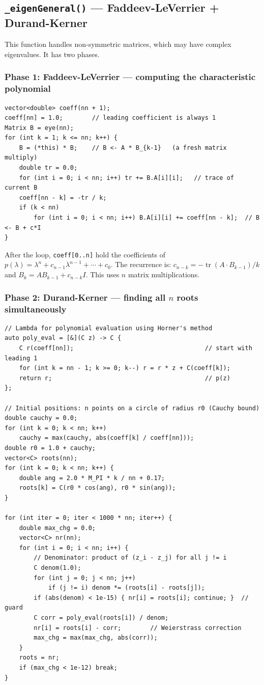 \documentclass[12pt, a4paper]{article}
\newcommand{\code}[1]{\texttt{\small#1}}
\newcommand{\fn}[1]{\texttt{\small\color{funcgreen}#1}}
\begin{document}
\subsection{\fn{\_eigenGeneral()} --- Faddeev-LeVerrier + Durand-Kerner}

This function handles non-symmetric matrices, which may have complex eigenvalues.
It has two phases.

\subsubsection{Phase 1: Faddeev-LeVerrier --- computing the characteristic polynomial}

\begin{lstlisting}
vector<double> coeff(nn + 1);
coeff[nn] = 1.0;        // leading coefficient is always 1
Matrix B = eye(nn);
for (int k = 1; k <= nn; k++) {
    B = (*this) * B;    // B <- A * B_{k-1}   (a fresh matrix multiply)
    double tr = 0.0;
    for (int i = 0; i < nn; i++) tr += B.A[i][i];   // trace of current B
    coeff[nn - k] = -tr / k;
    if (k < nn)
        for (int i = 0; i < nn; i++) B.A[i][i] += coeff[nn - k];  // B <- B + c*I
}
\end{lstlisting}

After the loop, \code{coeff[0..n]} hold the coefficients of
$p(\lambda) = \lambda^n + c_{n-1}\lambda^{n-1} + \cdots + c_0$.
The recurrence is: $c_{n-k} = -\operatorname{tr}(A \cdot B_{k-1}) / k$ and
$B_k = A B_{k-1} + c_{n-k} I$.  This uses $n$ matrix multiplications.

\subsubsection{Phase 2: Durand-Kerner --- finding all $n$ roots simultaneously}

\begin{lstlisting}
// Lambda for polynomial evaluation using Horner's method
auto poly_eval = [&](C z) -> C {
    C r(coeff[nn]);                                    // start with leading 1
    for (int k = nn - 1; k >= 0; k--) r = r * z + C(coeff[k]);
    return r;                                          // p(z)
};

// Initial positions: n points on a circle of radius r0 (Cauchy bound)
double cauchy = 0.0;
for (int k = 0; k < nn; k++)
    cauchy = max(cauchy, abs(coeff[k] / coeff[nn]));
double r0 = 1.0 + cauchy;
vector<C> roots(nn);
for (int k = 0; k < nn; k++) {
    double ang = 2.0 * M_PI * k / nn + 0.17;
    roots[k] = C(r0 * cos(ang), r0 * sin(ang));
}

for (int iter = 0; iter < 1000 * nn; iter++) {
    double max_chg = 0.0;
    vector<C> nr(nn);
    for (int i = 0; i < nn; i++) {
        // Denominator: product of (z_i - z_j) for all j != i
        C denom(1.0);
        for (int j = 0; j < nn; j++)
            if (j != i) denom *= (roots[i] - roots[j]);
        if (abs(denom) < 1e-15) { nr[i] = roots[i]; continue; }  // guard
        C corr = poly_eval(roots[i]) / denom;
        nr[i] = roots[i] - corr;        // Weierstrass correction
        max_chg = max(max_chg, abs(corr));
    }
    roots = nr;
    if (max_chg < 1e-12) break;
}
\end{lstlisting}
\end{document}
